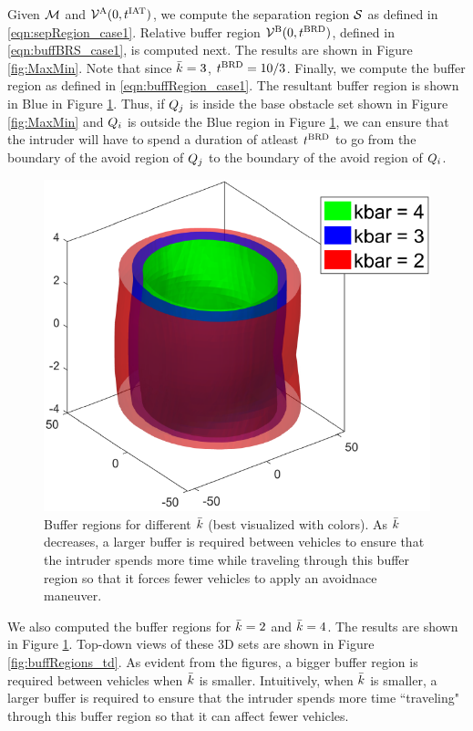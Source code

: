 Given $\mathcal{M}$ and $\mathcal{V}^{\text{A}}(0, t^\text{IAT})$, we compute the separation region $\mathcal{S}$ as defined in \eqref{eqn:sepRegion_case1}. Relative buffer region $\mathcal{V}^{\text{B}}(0, t^\text{BRD})$, defined in \eqref{eqn:buffBRS_case1}, is computed next. The results are shown in Figure \ref{fig:MaxMin}. Note that since $\bar{k} = 3$, $t^\text{BRD} = 10/3$. Finally, we compute the buffer region as defined in \eqref{eqn:buffRegion_case1}. The resultant buffer region is shown in Blue in Figure \ref{fig:buffRegions}. Thus, if $Q_j$ is inside the base obstacle set shown in Figure \ref{fig:MaxMin} and $Q_i$ is outside the Blue region in Figure \ref{fig:buffRegions}, we can ensure that the intruder will have to spend a duration of atleast $t^\text{BRD}$ to go from the boundary of the avoid region of $Q_j$ to the boundary of the avoid region of $Q_i$. 
\begin{figure}[H]
  \centering
  \includegraphics[width=\columnwidth]{"figs/bufferRegions_3D"}
  \caption{Buffer regions for different $\bar{k}$ (best visualized with colors). As $\bar{k}$ decreases, a larger buffer is required between vehicles to ensure that the intruder spends more time while traveling through this buffer region so that it forces fewer vehicles to apply an avoidnace maneuver.}
  \label{fig:buffRegions}
\end{figure}
We also computed the buffer regions for $\bar{k} = 2$ and $\bar{k} = 4$. The results are shown in Figure \ref{fig:buffRegions}. Top-down views of these 3D sets are shown in Figure \ref{fig:buffRegions_td}. As evident from the figures, a bigger buffer region is required between vehicles when $\bar{k}$ is smaller. Intuitively, when $\bar{k}$ is smaller, a larger buffer is required to ensure that the intruder spends more time ``traveling" through this buffer region so that it can affect fewer vehicles.             

